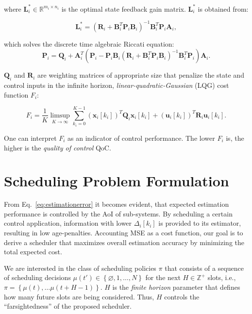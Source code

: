 where $\boldsymbol{L}_i^* \in \mathbb{R}^{m_i \times n_i}$ is the optimal state
feedback gain matrix. $\boldsymbol{L}^*_i$ is obtained from:

\begin{equation}
  \label{eq:optimalgain}
  \boldsymbol{L}_i^* = \left(\boldsymbol{R}_i + \boldsymbol{B}_i^T \boldsymbol{P}_i \boldsymbol{B}_i \right)^{-1} \boldsymbol{B}_i^T \boldsymbol{P}_i \boldsymbol{A}_i,
\end{equation}

which solves the discrete time algebraic Riccati equation:
\begin{equation}
  \label{eq:riccati}
  \boldsymbol{P}_i = \boldsymbol{Q}_{i} + \boldsymbol{A}_i^T \left(\boldsymbol{P}_i - \boldsymbol{P}_i \boldsymbol{B}_i ( \boldsymbol{R}_{i} + \boldsymbol{B}_i^T \boldsymbol{P}_i \boldsymbol{B}_i)^{- 1} \boldsymbol{B}_i^T \boldsymbol{P}_i \right) \boldsymbol{A}_i.
\end{equation}

$\boldsymbol{Q}_{i}$ and $\boldsymbol{R}_{i}$ are weighting matrices of
appropriate size that penalize the state and control inputs in the infinite
horizon, \textit{linear-quadratic-Gaussian} (LQG) cost function $F_i$:

\begin{equation}
  F_i = \dfrac{1}{K} \limsup_{K \rightarrow \infty} \sum_{k_i=0}^{K-1} (\boldsymbol{x}_i[k_i])^T \boldsymbol{Q}_i \boldsymbol{x}_i[k_i] +  (\boldsymbol{u}_i[k_i])^T \boldsymbol{R}_i \boldsymbol{u}_i[k_i]. 
\end{equation}

One can interpret $F_i$ as an indicator of control performance. The lower $F_i$
is, the higher is the \textit{quality of control} QoC.

\section{Scheduling Problem Formulation} \label{sec:problem}

From Eq.~\eqref{eq:estimationerror} it becomes evident, that expected estimation
performance is controlled by the AoI of sub-systems. By scheduling a certain
control application, information with lower $\Delta_i[k_i]$ is provided to its
estimator, resulting in low age-penalties. Accounting MSE as a cost function,
our goal is to derive a scheduler that maximizes overall estimation accuracy by
minimizing the total expected cost. 

We are interested in the class of scheduling policies $\pi$ that consists of a
sequence of scheduling decisions $\mu(t') \in \left\{\varnothing,1,\dots,N
\right\}$ for the next $H \in \mathbb{Z}^+$ slots, i.e.,
$\pi=\left\{\mu(t),\dots\mu(t+H-1) \right\}$. $H$ is the \textit{finite horizon}
parameter that defines how many future slots are being considered. Thus, $H$
controls the ``farsightedness'' of the proposed scheduler.

